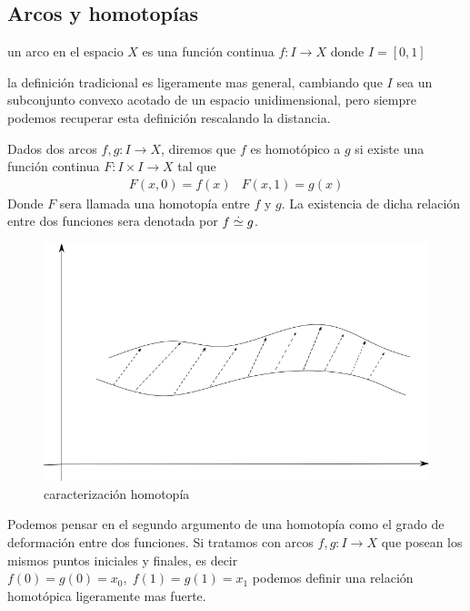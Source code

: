 \subsection{Arcos y homotopías}
\begin{definicion}[Arco]
  un arco en el espacio \(X\) es una función continua \(f : I \to X \)
  donde \(I = [0,1]\)
\end{definicion}
la definición tradicional es ligeramente mas general, cambiando que \(I\)
sea un subconjunto convexo acotado de un espacio unidimensional, pero
siempre podemos recuperar esta definición rescalando la distancia.

\begin{definicion}[Homotopia]
  Dados dos arcos \(f,g : I \to X\), diremos que \(f\) es homotópico a
  \(g\) si existe una función continua \(F : I \times I \to X \) tal que
  \[ \begin{matrix}
      F (x, 0) = f(x) & F (x, 1) = g(x)
     \end{matrix}
  \]
  Donde \(F\) sera llamada una homotopía entre \(f\) y \(g\). La
  existencia de dicha relación entre dos funciones sera denotada por \(f
  \stackrel{.}{\simeq} g\).
\end{definicion}
\begin{figure}[h]
  \centering
  \includegraphics[scale=0.3]{./imagenes/homotopia.png}
  \caption{caracterización homotopía}
  \label{fig:homotopia-entre-funciones}
\end{figure}
Podemos pensar en el segundo argumento de una homotopía como el grado de
deformación entre dos funciones.
Si tratamos con arcos \(f,g : I \to X\) que posean los mismos puntos
iniciales y finales, es decir \(f(0) = g(0) = x_0, \; f(1) = g(1) =
x_1 \) podemos definir una relación homotópica ligeramente mas fuerte.

